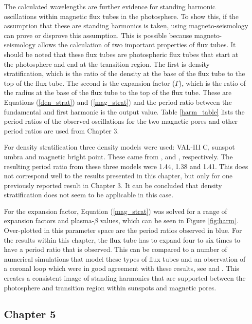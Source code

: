     The calculated wavelengths are further evidence for standing harmonic oscillations within magnetic flux tubes in the photosphere.
    To show this, if the assumption that these are standing harmonics is taken, using magneto-seismology can prove or disprove this assumption.
    This is possible because magneto-seismology allows the calculation of two important properties of flux tubes.
    It should be noted that these flux tubes are photospheric flux tubes that start at the photosphere and end at the transition region.
    The first is density stratification, which is the ratio of the density at the base of the flux tube to the top of the flux tube.
    The second is the expansion factor ($\Gamma$), which is the ratio of the radius at the base of the flux tube to the top of the flux tube.
    These are Equations (\ref{den_strat}) and (\ref{mag_strat}) and the period ratio between the fundamental and first harmonic is the output value.
    Table \ref{harm_table} lists the period ratios of the observed oscillations for the two magnetic pores and other period ratios are used from Chapter 3.

	For density stratification three density models were used: VAL-III C, sunspot umbra and magnetic bright point.
	These came from \cite{1981ApJS...45..635V}, \cite{Maltby1986} and \cite{GFME13a,GFE14}, respectively.
	The resulting period ratio from these three models were 1.44, 1.38 and 1.41.
	This does not correspond well to the results presented in this chapter, but only for one previously reported result in Chapter 3.
	It can be concluded that density stratification does not seem to be applicable in this case.

	For the expansion factor, Equation (\ref{mag_strat}) was solved for a range of expansion factors and plasma-$\beta$ values, which can be seen in Figure \ref{fig:harm}.
	Over-plotted in this parameter space are the period ratios observed in blue.
	For the results within this chapter, the flux tube has to expand four to six times to have a period ratio that is observed.
	This can be compared to a number of numerical simulations that model these types of flux tubes and an observation of a coronal loop which were in good agreement with these results, see \cite{khomenko,fedun2,fedun1} and \cite{2008A&A...489L..57K}.
	This creates a consistent image of standing harmonics that are supported between the photosphere and transition region within sunspots and magnetic pores.

	\subsection{Chapter 5}
    
